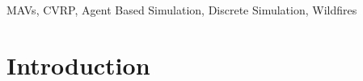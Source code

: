 \documentclass[preprint,review, 11pt,3p,authoryear]{elsarticle}
\newcommand{\rev}{\color{black}} %
\begin{document}
\begin{frontmatter}
\begin{abstract}
\end{abstract}

\begin{keyword}
MAVs, CVRP, Agent Based Simulation, Discrete Simulation, Wildfires
\end{keyword}

\end{frontmatter}


\section{Introduction}
\label{intro}
\end{document}
